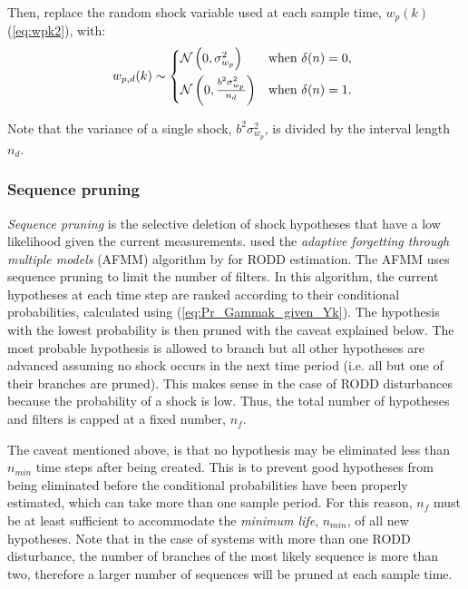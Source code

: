 Then, replace the random shock variable used at each sample time, $w_p(k)$ (\ref{eq:wpk2}), with:
\begin{equation} \label{eq:wpdk}
	w_{p,d}(k) \sim 
	\begin{cases*}
		\mathcal{N}\left(0, \sigma_{w_p}^2\right) & \text{when} $\delta(n) = 0$, \\
		\mathcal{N}\left(0, \frac{b^2\sigma_{w_p}^2}{n_d}\right) & \text{when} $\delta(n) = 1$.
	\end{cases*}
\end{equation}

Note that the variance of a single shock, $b^2\sigma_{w_p}^2$, is divided by the interval length $n_d$.

\subsubsection{Sequence pruning} \label{subsec-pruning}

\textit{Sequence pruning} is the selective deletion of shock hypotheses that have a low likelihood given the current measurements. \cite{eriksson_classification_1996} used the \textit{adaptive forgetting through multiple models} (AFMM) algorithm by \cite{andersson_adaptive_1985} for RODD estimation. The AFMM uses sequence pruning to limit the number of filters. In this algorithm, the current hypotheses at each time step are ranked according to their conditional probabilities, calculated using (\ref{eq:Pr_Gammak_given_Yk}). The hypothesis with the lowest probability is then pruned with the caveat explained below. The most probable hypothesis is allowed to branch but all other hypotheses are advanced assuming no shock occurs in the next time period (i.e. all but one of their branches are pruned). This makes sense in the case of RODD disturbances because the probability of a shock is low. Thus, the total number of hypotheses and filters is capped at a fixed number, $n_f$.

The caveat mentioned above, is that no hypothesis may be eliminated less than $n_{min}$ time steps after being created. This is to prevent good hypotheses from being eliminated before the conditional probabilities have been properly estimated, which can take more than one sample period. For this reason, $n_f$ must be at least sufficient to accommodate the \textit{minimum life}, $n_{min}$, of all new hypotheses. Note that in the case of systems with more than one RODD disturbance, the number of branches of the most likely sequence is more than two, therefore a larger number of sequences will be pruned at each sample time.

